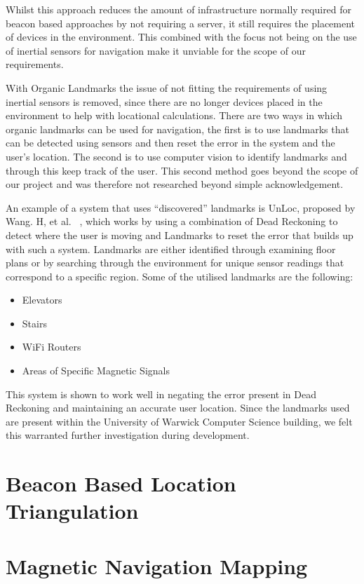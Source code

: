 \documentclass[12pt,a4paper]{report}
\begin{document}
Whilst this approach reduces the amount of infrastructure normally required for beacon based approaches by not requiring a server, it still requires the placement of devices in the environment. This combined with the focus not being on the use of inertial sensors for navigation make it unviable for the scope of our requirements.

With Organic Landmarks the issue of not fitting the requirements of using inertial sensors is removed, since there are no longer devices placed in the environment to help with locational calculations. There are two ways in which organic landmarks can be used for navigation, the first is to use landmarks that can be detected using sensors and then reset the error in the system and the user's location. The second is to use computer vision to identify landmarks and through this keep track of the user. This second method goes beyond the scope of our project and was therefore not researched beyond simple acknowledgement.

An example of a system that uses ``discovered'' landmarks is UnLoc, proposed by Wang. H, et al. ~\cite{wang2012no}, which works by using a combination of Dead Reckoning to detect where the user is moving and Landmarks to reset the error that builds up with such a system. Landmarks are either identified through examining floor plans or by searching through the environment for unique sensor readings that correspond to a specific region. Some of the utilised landmarks are the following:

\begin{itemize}
	\item Elevators
	\item Stairs
	\item WiFi Routers
	\item Areas of Specific Magnetic Signals
\end{itemize}

This system is shown to work well in negating the error present in Dead Reckoning and maintaining an accurate user location. Since the landmarks used are present within the University of Warwick Computer Science building, we felt this warranted further investigation during development.

\section{Beacon Based Location Triangulation}

\section{Magnetic Navigation Mapping}
 
\end{document}
